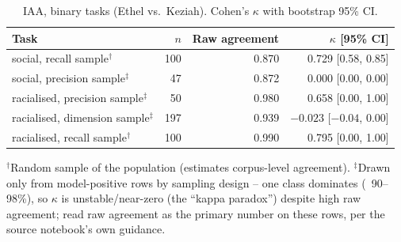 

\begin{table}[htbp]
\centering
\footnotesize
\setlength{\tabcolsep}{4pt}
\caption{IAA, binary tasks (Ethel vs.\ Keziah). Cohen's $\kappa$ with bootstrap 95\% CI.}
\label{tab:iaa-binary}
\begin{tabular}{@{} l r r r @{}}
\toprule
Task & $n$ & Raw agreement & $\kappa$ [95\% CI] \\
\midrule
social, recall sample$^{\dagger}$ & 100 & 0.870 & 0.729 [0.58, 0.85] \\
social, precision sample$^{\ddagger}$ & 47 & 0.872 & 0.000 [0.00, 0.00] \\
racialised, precision sample$^{\ddagger}$ & 50 & 0.980 & 0.658 [0.00, 1.00] \\
racialised, dimension sample$^{\ddagger}$ & 197 & 0.939 & $-0.023$ [$-0.04$, 0.00] \\
racialised, recall sample$^{\dagger}$ & 100 & 0.990 & 0.795 [0.00, 1.00] \\
\bottomrule
\end{tabular}

\vspace{2pt}
\raggedright\footnotesize
$^{\dagger}$Random sample of the population (estimates corpus-level agreement). $^{\ddagger}$Drawn only from model-positive rows by sampling design -- one class dominates (~90--98\%), so $\kappa$ is unstable/near-zero (the ``kappa paradox'') despite high raw agreement; read raw agreement as the primary number on these rows, per the source notebook's own guidance.
\end{table}

